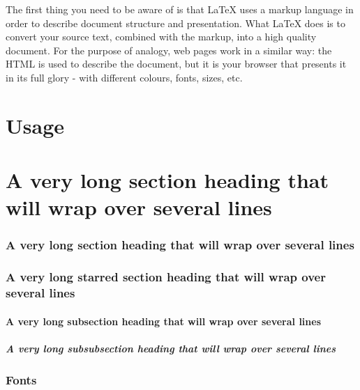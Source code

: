 \documentclass[a4paper,serif]{module}       %
\begin{document}
The first thing you need to be aware of is that LaTeX uses a markup language in order to describe document structure and presentation. What LaTeX does is to convert your source text, combined with the markup, into a high quality document. For the purpose of analogy, web pages work in a similar way: the HTML is used to describe the document, but it is your browser that presents it in its full glory - with different colours, fonts, sizes, etc.

\part{Usage}

%

\part{A very long section heading that will wrap over several lines}

\section{A very long section heading that will wrap over several lines}

\section*{A very long starred section heading that will wrap over several lines}

\subsection{A very long subsection heading that will wrap over several lines}

\subsubsection{A very long subsubsection heading that will wrap over several lines}

\section{Fonts}
\end{document}
